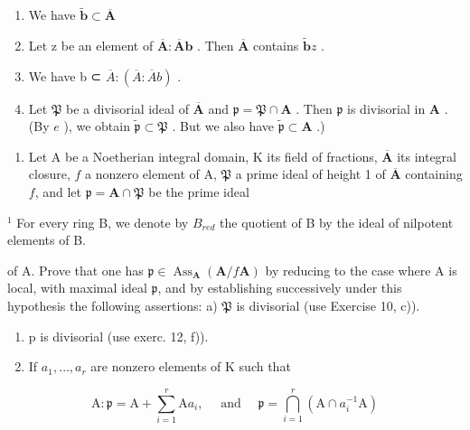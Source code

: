\begin{enumerate}
\def\labelenumi{\alph{enumi})}
\setcounter{enumi}{2}
\item
  We have \(\tilde{\mathbf{b}}\subset \overline{\mathbf{A}}\)
\item
  Let z be an element of \(\overline{\mathbf{A}}:\overline{\mathbf{A}}\mathbf{b}\) . Then \(\overline{\mathbf{A}}\) contains \(\tilde{\mathbf{b}}z\) .
\item
  We have b ⊂ \(\overline{A}:(\overline{A}:\overline{A}b)\) .
\item
  Let \(\mathfrak{P}\) be a divisorial ideal of \(\overline{\mathbf{A}}\) and \(\mathfrak{p} = \mathfrak{P} \cap \mathbf{A}\) . Then \(\mathfrak{p}\) is divisorial in \(\mathbf{A}\) . (By \(e\) ), we obtain \(\tilde{\mathfrak{p}} \subset \mathfrak{P}\) . But we also have \(\tilde{\mathfrak{p}} \subset \mathbf{A}\) .)
\end{enumerate}

\begin{enumerate}
\def\labelenumi{\arabic{enumi})}
\setcounter{enumi}{12}
\tightlist
\item
  Let A be a Noetherian integral domain, K its field of fractions, \(\overline{\mathbf{A}}\) its integral closure, \(f\) a nonzero element of A, \(\mathfrak{P}\) a prime ideal of height 1 of \(\overline{\mathbf{A}}\) containing \(f\), and let \(\mathfrak{p} = \mathbf{A} \cap \mathfrak{P}\) be the prime ideal
\end{enumerate}

\(^{1}\) For every ring B, we denote by \(B_{red}\) the quotient of B by the ideal of nilpotent elements of B.

of A. Prove that one has \(\mathfrak{p} \in \operatorname{Ass}_{\mathbf{A}}(\mathbf{A}/f\mathbf{A})\) by reducing to the case where A is local, with maximal ideal \(\mathfrak{p}\), and by establishing successively under this hypothesis the following assertions: a) \(\mathfrak{P}\) is divisorial (use Exercise 10, c)).

\begin{enumerate}
\def\labelenumi{\alph{enumi})}
\setcounter{enumi}{1}
\item
  p is divisorial (use exerc. 12, f)).
\item
  If \(a_{1},\ldots,a_{r}\) are nonzero elements of K such that
\end{enumerate}

\[
\mathrm{A}: \mathfrak {p} = \mathrm{A} + \sum_ {i = 1} ^ {r} \mathrm{A} a _ {i}, \quad \text { and } \quad \mathfrak {p} = \bigcap_ {i = 1} ^ {r} (\mathrm{A} \cap a _ {i} ^ {- 1} \mathrm{A})
\]

